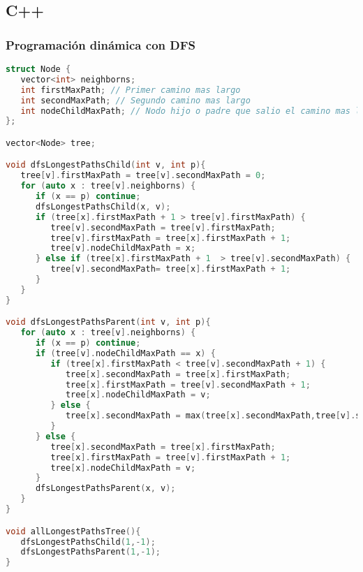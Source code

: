 \subsection{C++}

\subsubsection{Programación dinámica con DFS}
\begin{lstlisting}[language=C++]
struct Node {
   vector<int> neighborns;
   int firstMaxPath; // Primer camino mas largo
   int secondMaxPath; // Segundo camino mas largo
   int nodeChildMaxPath; // Nodo hijo o padre que salio el camino mas largo
};

vector<Node> tree;

void dfsLongestPathsChild(int v, int p){
   tree[v].firstMaxPath = tree[v].secondMaxPath = 0;
   for (auto x : tree[v].neighborns) {
      if (x == p) continue;
      dfsLongestPathsChild(x, v);
      if (tree[x].firstMaxPath + 1 > tree[v].firstMaxPath) {
         tree[v].secondMaxPath = tree[v].firstMaxPath;
         tree[v].firstMaxPath = tree[x].firstMaxPath + 1;
         tree[v].nodeChildMaxPath = x;
      } else if (tree[x].firstMaxPath + 1  > tree[v].secondMaxPath) {
         tree[v].secondMaxPath= tree[x].firstMaxPath + 1;
      }
   }
}

void dfsLongestPathsParent(int v, int p){
   for (auto x : tree[v].neighborns) {
      if (x == p) continue;
      if (tree[v].nodeChildMaxPath == x) {
         if (tree[x].firstMaxPath < tree[v].secondMaxPath + 1) {
            tree[x].secondMaxPath = tree[x].firstMaxPath;
            tree[x].firstMaxPath = tree[v].secondMaxPath + 1;
            tree[x].nodeChildMaxPath = v;
         } else {
            tree[x].secondMaxPath = max(tree[x].secondMaxPath,tree[v].secondMaxPath + 1);
         }
      } else {
         tree[x].secondMaxPath = tree[x].firstMaxPath;
         tree[x].firstMaxPath = tree[v].firstMaxPath + 1;
         tree[x].nodeChildMaxPath = v;
      }
      dfsLongestPathsParent(x, v);
   }
}

void allLongestPathsTree(){
   dfsLongestPathsChild(1,-1);
   dfsLongestPathsParent(1,-1);
}
\end{lstlisting}

